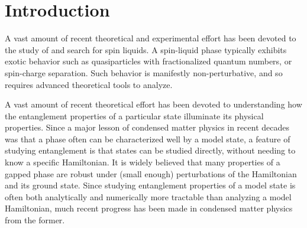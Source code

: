 \documentclass[11pt]{iopart}
\begin{document}
\tableofcontents

\section{Introduction}
\label{sec:introduction}



A vast amount of recent theoretical and experimental effort has been devoted to the study of and search for spin liquids. A spin-liquid phase typically exhibits exotic behavior such as quasiparticles 
with fractionalized quantum numbers, or spin-charge separation. Such behavior is manifestly non-perturbative, and so requires advanced theoretical tools to analyze. 

A vast amount of recent theoretical effort has been devoted to understanding how the entanglement properties of a particular state illuminate its physical properties. Since a major lesson of condensed matter physics in recent decades was that a phase often can be characterized well by a model state, a feature of studying entanglement is that states can be studied directly, without needing to know a specific Hamiltonian. 
It is widely believed that many properties of a gapped phase are robust under (small enough) perturbations of the Hamiltonian and its ground state. Since studying entanglement properties of a model state is often both analytically and numerically more tractable than analyzing a model Hamiltonian, much recent progress has been made in condensed matter physics from the former.
\end{document}
